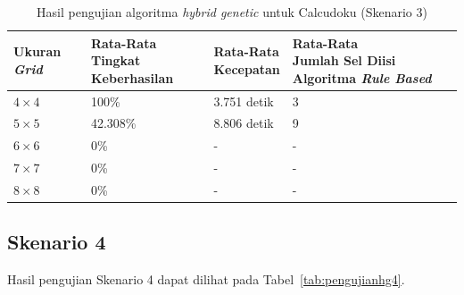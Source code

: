 \begin{table}
\centering
\captionsetup{justification=centering}
\caption[Hasil pengujian algoritma \textit{hybrid genetic} untuk Calcudoku (Skenario 3)]{Hasil pengujian algoritma \textit{hybrid genetic} untuk Calcudoku (Skenario 3)}
\begin{tabular}{| l | l | l | l |}
\hline
Ukuran \textit{Grid} & \makecell[l]{Rata-Rata \\ Tingkat Keberhasilan} & \makecell[l]{Rata-Rata \\ Kecepatan} & \makecell[l]{Rata-Rata \\ Jumlah Sel Diisi Algoritma \textit{Rule Based}} \\
\hline \hline
\begin{math}4 \times 4\end{math} & 100\% & 3.751 detik & 3 \\
\hline
\begin{math}5 \times 5\end{math} & 42.308\% & 8.806 detik & 9 \\
\hline
\begin{math}6 \times 6\end{math} & 0\% & - & - \\
\hline
\begin{math}7 \times 7\end{math} & 0\% & - & - \\
\hline
\begin{math}8 \times 8\end{math} & 0\% & - & - \\
\hline
\end{tabular}
\label{tab:pengujianhg3}
\end{table}

\subsection{Skenario 4}
\label{sec:skenario4}

Hasil pengujian Skenario 4 dapat dilihat pada Tabel~\ref{tab:pengujianhg4}.

